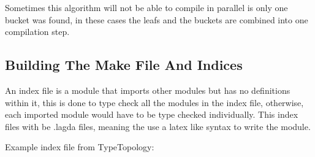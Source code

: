 Sometimes this algorithm will not be able to compile in parallel is only one
bucket was found, in these cases the leafs and the buckets are combined into
one compilation step.


\subsection{Building The Make File And Indices} \label{sub:building make file and index }

An index file is a module that imports other modules but has no definitions
within it, this is done to type check all the modules in the index file,
otherwise, each imported module would have to be type checked individually.
This index files with be .lagda files, meaning the use a latex like syntax to
write the module.

Example index file from TypeTopology:

